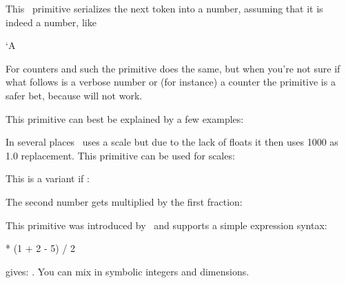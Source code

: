 \stopoldprimitive

\startoldprimitive[title={\prm {number}}]

This \TEX\ primitive serializes the next token into a number, assuming that it
is indeed a number, like

\starttyping
\number`A
\number\scratchcounter
\stoptyping

For counters and such the  primitive does the same, but when you're
not sure if what follows is a verbose number or (for instance) a counter the
 primitive is a safer bet, because  will not work.

\stopoldprimitive

\startnewprimitive[title={\prm {numericscale}}]

This primitive can best be explained by a few examples:

\startbuffer
\the{}
\the{}
\the{}
\the{}
\stopbuffer

\typebuffer

In several places \TEX\ uses a scale but due to the lack of floats it then uses
1000 as 1.0 replacement. This primitive can be used for  scales:

\startlines \getbuffer \stoplines

\stopnewprimitive

\startnewprimitive[title={\prm {numericscaled}}]

This is a variant if :

\startbuffer
{}
\the{}   \scratchcounter
\the{} \scratchcounter
\the{}  \scratchcounter
\the{}  \scratchcounter
\stopbuffer

\typebuffer

The second number gets multiplied by the first fraction:

\startlines \getbuffer \stoplines

\stopnewprimitive

\startoldprimitive[title={\prm {numexpr}}]

This primitive was introduced by \ETEX\ and supports a simple expression syntax:

\startbuffer
\the{} * (1 + 2 - 5) / 2 \relax
\stopbuffer

\typebuffer

gives: \inlinebuffer. You can mix in symbolic integers and dimensions.

